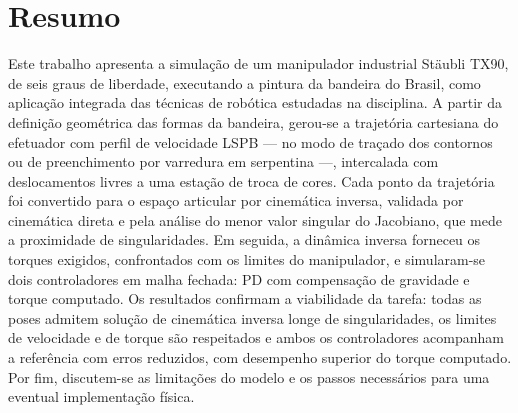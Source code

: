 \newpage
\section{Resumo}

Este trabalho apresenta a simulação de um manipulador industrial Stäubli TX90, de
seis graus de liberdade, executando a pintura da bandeira do Brasil, como aplicação
integrada das técnicas de robótica estudadas na disciplina. A partir da definição
geométrica das formas da bandeira, gerou-se a trajetória cartesiana do efetuador com
perfil de velocidade LSPB --- no modo de traçado dos contornos ou de preenchimento
por varredura em serpentina ---, intercalada com deslocamentos livres a uma estação
de troca de cores. Cada ponto da trajetória foi convertido para o espaço articular
por cinemática inversa, validada por cinemática direta e pela análise do menor valor
singular do Jacobiano, que mede a proximidade de singularidades. Em seguida, a
dinâmica inversa forneceu os torques exigidos, confrontados com os limites do
manipulador, e simularam-se dois controladores em malha fechada: PD com compensação
de gravidade e torque computado. Os resultados confirmam a viabilidade da tarefa:
todas as poses admitem solução de cinemática inversa longe de singularidades, os
limites de velocidade e de torque são respeitados e ambos os controladores
acompanham a referência com erros reduzidos, com desempenho superior do torque
computado. Por fim, discutem-se as limitações do modelo e os passos necessários para
uma eventual implementação física.